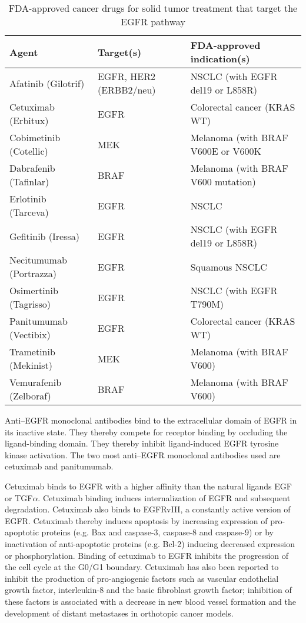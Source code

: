 {{{      \begin{table}[!htbp]
          \caption[Targeted Cancer Agents]{FDA-approved cancer drugs for solid tumor treatment that target the EGFR pathway}
          \centering
          \begin{tabular}{ |p{4cm}|p{3.7cm}|p{6.3cm}|}
          \hline
          Agent & Target(s) & FDA-approved indication(s) \\ \hline \hline
          Afatinib (Gilotrif) & EGFR, HER2 (ERBB2/neu) & NSCLC (with EGFR del19 or L858R) \\
          Cetuximab (Erbitux) & EGFR & Colorectal cancer (KRAS WT) \\
          Cobimetinib (Cotellic) & MEK & Melanoma (with BRAF V600E or V600K \\
          Dabrafenib (Tafinlar) & BRAF & Melanoma (with BRAF V600 mutation) \\
          Erlotinib (Tarceva) & EGFR & NSCLC \\
          Gefitinib (Iressa) & EGFR & NSCLC (with EGFR del19 or L858R) \\
          Necitumumab (Portrazza) & EGFR & Squamous NSCLC \\
          Osimertinib (Tagrisso) & EGFR & NSCLC (with EGFR T790M) \\
          Panitumumab (Vectibix) & EGFR & Colorectal cancer (KRAS WT) \\
          Trametinib (Mekinist) & MEK & Melanoma (with BRAF V600) \\
          Vemurafenib (Zelboraf) & BRAF & Melanoma (with BRAF V600) \\
          \hline
        \end{tabular}
      \end{table}

      Anti--EGFR monoclonal antibodies bind to the extracellular domain of EGFR
      in its inactive state. They thereby compete for receptor binding by
      occluding the ligand-binding domain. They thereby inhibit ligand-induced
      EGFR tyrosine kinase activation. The two most anti--EGFR monoclonal
      antibodies used are cetuximab and panitumumab.

      Cetuximab binds to EGFR with a higher affinity than the natural ligands
      EGF or TGF$\alpha$. Cetuximab binding induces internalization of EGFR and
      subsequent degradation. Cetuximab also binds to EGFRvIII, a constantly
      active version of EGFR. Cetuximab thereby induces apoptosis by increasing
      expression of pro-apoptotic proteins (e.g. Bax and caspase-3, caspase-8
      and caspase-9) or by inactivation of anti-apoptotic proteins (e.g. Bcl-2)
      inducing decreased expression or phosphorylation. Binding of cetuximab to
      EGFR inhibits the progression of the cell cycle at the G0/G1 boundary.
      Cetuximab has also been reported to inhibit the production of
      pro-angiogenic factors such as vascular endothelial growth factor,
      interleukin-8 and the basic fibroblast growth factor; inhibition of these
      factors is associated with a decrease in new blood vessel formation and
      the development of distant metastases in orthotopic cancer models.

}}}
